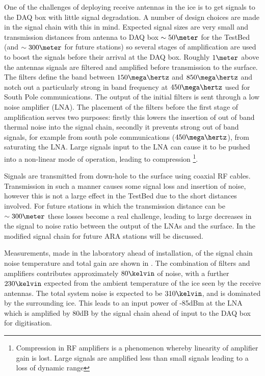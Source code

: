 One of the challenges of deploying receive antennas in the ice is to get signals to the DAQ box with little signal degradation. A number of design choices are made in the signal chain with this in mind. Expected signal sizes are very small and transmission distances from antenna to DAQ box $\sim 50\meter$ for the TestBed (and $\sim 300\meter$ for future stations) so several stages of amplification are used to boost the signals before their arrival at the DAQ box. Roughly $1 \meter$ above the antennas signals are filtered and amplified before transmission to the surface. The filters define the band between $150 \mega\hertz$ and $850 \mega\hertz$ and notch out a particularly strong in band frequency at $450 \mega \hertz$ used for South Pole communications. The output of the initial filters is sent through a low noise amplifier (LNA). The placement of the filters before the first stage of amplification serves two purposes: firstly this lowers the insertion of out of band thermal noise into the signal chain, secondly it prevents strong out of band signals, for example from south pole communications ($450 \mega\hertz$), from saturating the LNA. Large signals input to the LNA can cause it to be pushed into a non-linear mode of operation, leading to compression \footnote{Compression in RF amplifiers is a phenomenon whereby linearity of amplifier gain is lost. Large signals are amplified less than small signals leading to a loss of dynamic range}.

Signals are transmitted from down-hole to the surface using coaxial RF cables. Transmission in such a manner causes some signal loss and insertion of noise, however this is not a large effect in the TestBed due to the short distances involved. For future stations in which the transmission distance can be $\sim 300 \meter$ these losses become a real challenge, leading to large decreases in the signal to noise ratio between the output of the LNAs and the surface. In  the modified signal chain for future ARA stations will be discussed.

Measurements, made in the laboratory ahead of installation, of the signal chain noise temperature and total gain are shown in . The combination of filters and amplifiers contributes approximately $80 \kelvin$ of noise, with a further $230 \kelvin$ expected from the ambient temperature of the ice seen by the receive antennas. The total system noise is expected to be $310 \kelvin$, and is dominated by the surrounding ice. This leads to an input power of -85dBm at the LNA which is amplified by 80dB by the signal chain ahead of input to the DAQ box for digitisation.

